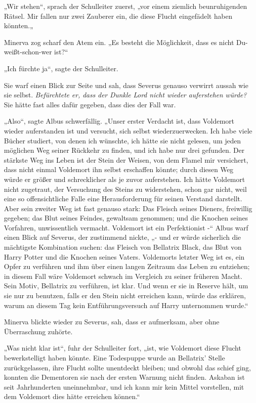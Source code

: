 {„Wir stehen“, sprach der Schulleiter zuerst, „vor einem ziemlich beunruhigenden Rätsel. Mir fallen nur zwei Zauberer ein, die diese Flucht eingefädelt haben könnten.„

Minerva zog scharf den Atem ein. „Es besteht die Möglichkeit, dass es nicht Du-weißt-schon-wer ist?“

„Ich fürchte ja“, sagte der Schulleiter.

Sie warf einen Blick zur Seite und sah, dass Severus genauso verwirrt aussah wie sie selbst. \emph{Befürchtete er, dass der Dunkle Lord nicht wieder auferstehen würde?} Sie hätte fast alles dafür gegeben, dass dies der Fall war.

„Also“, sagte Albus schwerfällig. „Unser erster Verdacht ist, dass Voldemort wieder auferstanden ist und versucht, sich selbst wiederzuerwecken. Ich habe viele Bücher studiert, von denen ich wünschte, ich hätte sie nicht gelesen, um jeden möglichen Weg seiner Rückkehr zu finden, und ich habe nur drei gefunden. Der stärkste Weg ins Leben ist der Stein der Weisen, von dem Flamel mir versichert, dass nicht einmal Voldemort ihn selbst erschaffen könnte; durch diesen Weg würde er größer und schrecklicher als je zuvor auferstehen. Ich hätte Voldemort nicht zugetraut, der Versuchung des Steins zu widerstehen, schon gar nicht, weil eine so offensichtliche Falle eine Herausforderung für seinen Verstand darstellt. Aber sein zweiter Weg ist fast genauso stark: Das Fleisch seines Dieners, freiwillig gegeben; das Blut seines Feindes, gewaltsam genommen; und die Knochen seines Vorfahren, unwissentlich vermacht. Voldemort ist ein Perfektionist -“ Albus warf einen Blick auf Severus, der zustimmend nickte, „- und er würde sicherlich die mächtigste Kombination suchen: das Fleisch von Bellatrix Black, das Blut von Harry Potter und die Knochen seines Vaters. Voldemorts letzter Weg ist es, ein Opfer zu verführen und ihm über einen langen Zeitraum das Leben zu entziehen; in diesem Fall wäre Voldemort schwach im Vergleich zu seiner früheren Macht. Sein Motiv, Bellatrix zu verführen, ist klar. Und wenn er sie in Reserve hält, um sie nur zu benutzen, falls er den Stein nicht erreichen kann, würde das erklären, warum an diesem Tag kein Entführungsversuch auf Harry unternommen wurde.“

Minerva blickte wieder zu Severus, sah, dass er aufmerksam, aber ohne Überraschung zuhörte.

„Was nicht klar ist“, fuhr der Schulleiter fort, „ist, wie Voldemort diese Flucht bewerkstelligt haben könnte. Eine Todespuppe wurde an Bellatrix' Stelle zurückgelassen, ihre Flucht sollte unentdeckt bleiben; und obwohl das schief ging, konnten die Dementoren sie nach der ersten Warnung nicht finden. Askaban ist seit Jahrhunderten uneinnehmbar, und ich kann mir kein Mittel vorstellen, mit dem Voldemort dies hätte erreichen können.“

}
